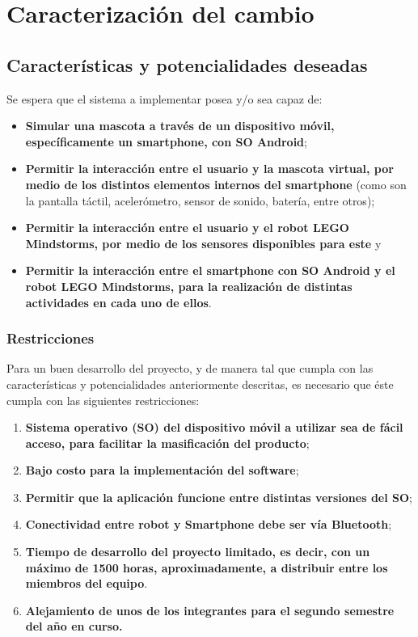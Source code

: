 \newpage
\section{Caracterizaci\'on del cambio}
\subsection{Caracter\'isticas y potencialidades deseadas}

Se espera que el sistema a implementar posea y/o sea capaz de:
\begin{itemize}
\item {\bf Simular una mascota a trav\'es de un dispositivo m\'ovil, espec\'ificamente un smartphone, con SO Android};
\item {\bf Permitir la interacci\'on entre el usuario y la mascota virtual, por medio de los distintos elementos internos del smartphone} (como son la pantalla t\'actil, a\-ce\-le\-r\'o\-me\-tro, sensor de sonido, bater\'ia, entre otros);
\item {\bf Permitir la interacci\'on entre el usuario y el robot LEGO Mindstorms, por medio de los sensores disponibles para este} y
\item {\bf Permitir la interacci\'on entre el smartphone con SO Android y el robot LEGO Mindstorms, para la realizaci\'on de distintas actividades en cada uno de ellos}.
\end{itemize}

\subsubsection{Restricciones}

Para un buen desarrollo del proyecto, y de manera tal que cumpla con las caracter\'isticas y potencialidades anteriormente descritas, es necesario que \'este cumpla con las siguientes restricciones:
\begin{enumerate}
\item {\bf Sistema operativo (SO) del dispositivo m\'ovil a utilizar sea de f\'acil acceso, para facilitar la masificaci\'on del producto};
\item {\bf Bajo costo para la implementaci\'on del software};
\item {\bf Permitir que la aplicaci\'on funcione entre distintas versiones del SO};
\item {\bf Conectividad entre robot y Smartphone debe ser v\'ia Bluetooth};
\item {\bf Tiempo de desarrollo del proyecto limitado, es decir, con un m\'aximo de 1500 horas, aproximadamente, a distribuir entre los miembros del equipo}.
\item {\bf Alejamiento de unos de los integrantes para el segundo semestre del a\~no en curso.}
\end{enumerate}

